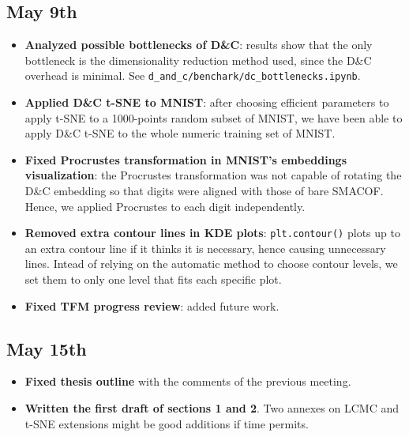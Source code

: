 \documentclass[a4paper,12pt]{article}
\begin{document}
\subsection{May 9th}
\begin{itemize}
    \item \textbf{Analyzed possible bottlenecks of D\&C}: results show that the only bottleneck is the dimensionality reduction method used, since the D\&C overhead is minimal. See \verb|d_and_c/benchark/dc_bottlenecks.ipynb|.
    \item \textbf{Applied D\&C t-SNE to MNIST}: after choosing efficient parameters to apply t-SNE to a 1000-points random subset of MNIST, we have been able to apply D\&C t-SNE to the whole numeric training set of MNIST.
    \item \textbf{Fixed Procrustes transformation in MNIST's embeddings visualization}: the Procrustes transformation was not capable of rotating the D\&C embedding so that digits were aligned with those of bare SMACOF. Hence, we applied Procrustes to each digit independently.
    \item \textbf{Removed extra contour lines in KDE plots}: \verb|plt.contour()| plots up to an extra contour line if it thinks it is necessary, hence causing unnecessary lines. Intead of relying on the automatic method to choose contour levels, we set them to only one level that fits each specific plot.
    \item \textbf{Fixed TFM progress review}: added future work.
\end{itemize}

\subsection{May 15th}
\begin{itemize}
    \item \textbf{Fixed thesis outline} with the comments of the previous meeting.
    \item \textbf{Written the first draft of sections 1 and 2}. Two annexes on LCMC and t-SNE extensions might be good additions if time permits.
\end{itemize}
\end{document}
